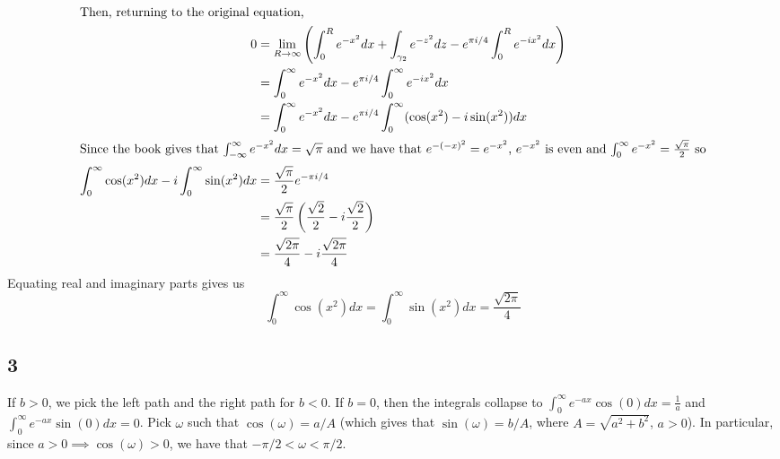 \documentclass[12pt,letterpaper]{article}
\theoremstyle{definition}
\newcommand{\incfig}[1]{}
\begin{document}
\begin{align*}
  \intertext{Then, returning to the original equation,}
  0 &= \lim_{R \rightarrow\infty}\left(\int_{0}^{R}e^{-x^{2}}dx + \int_{\gamma_{2}}e^{-z^{2}}dz - e^{\pi i /4}\int_{0}^{R}e^{-ix^{2}}dx\right) \\
    &= \int_{0}^{\infty}e^{-x^{2}}dx - e^{\pi i /4}\int_{0}^{\infty}e^{-ix^{2}}dx \\
    &= \int_{0}^{\infty}e^{-x^{2}}dx - e^{\pi i /4}\int_{0}^{\infty}(\cos(x^{2}) - i\sin(x^{2}))dx \\
  \intertext{Since the book gives that $\int_{-\infty}^{\infty}e^{-x^{2}}dx = \sqrt{\pi}$ and we have that $e^{-(-x)^{2}} = e^{-x^{2}}$, $e^{-x^{2}}$ is even and $\int_{0}^{\infty}e^{-x^{2}} = \frac{\sqrt{\pi}}{2}$ so}
  \int_{0}^{\infty}\cos(x^{2})dx - i\int_{0}^{\infty}\sin(x^{2})dx &= \frac{\sqrt{\pi}}{2}e^{-\pi i /4} \\
    &= \frac{\sqrt{\pi}}{2}\left(\frac{\sqrt{2}}{2} - i\frac{\sqrt{2}}{2}\right) \\
    &= \frac{\sqrt{2\pi}}{4} - i\frac{\sqrt{2\pi}}{4} \\
\end{align*}
Equating real and imaginary parts gives us
\[
  \int_{0}^{\infty}\cos(x^{2})dx = \int_{0}^{\infty}\sin(x^{2})dx = \frac{\sqrt{2\pi}}{4}
\]

\subsection*{3}

\begin{figure}[H]
  \centering
  \incfig{path2}
\end{figure}

If $b > 0$, we pick the left path and the right path for $b < 0$. If $b = 0$, then the integrals collapse to $\int_{0}^{\infty}e^{-ax}\cos(0)dx = \frac{1}{a}$ and $\int_{0}^{\infty}e^{-ax}\sin(0)dx = 0$. Pick $\omega$ such that $\cos(\omega) = a / A$ (which gives that $\sin(\omega) = b / A$, where $A = \sqrt{a^{2} + b^{2}}$, $a > 0$). In particular, since $a > 0 \implies \cos(\omega) > 0$, we have that $-\pi/2 < \omega < \pi/2$.
\end{document}
